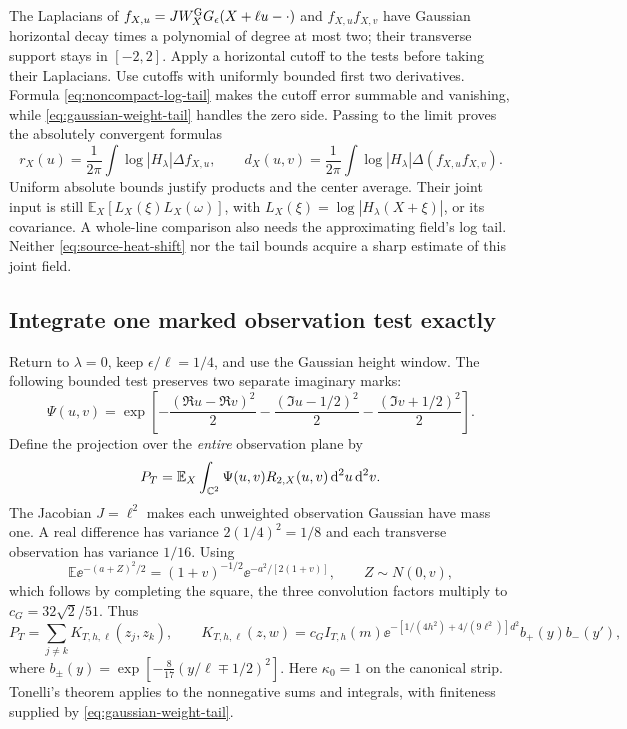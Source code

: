 The Laplacians of $f_{X,u}=JW_X^{\rm G}G_\epsilon(X+\ell u-\cdot)$
and $f_{X,u}f_{X,v}$ have Gaussian horizontal decay times a polynomial
of degree at most two; their transverse support stays in $[-2,2]$.
Apply a horizontal cutoff to the tests before taking their Laplacians.
Use cutoffs with uniformly bounded first two derivatives. Formula \eqref{eq:noncompact-log-tail} makes the
cutoff error summable and vanishing, while
\eqref{eq:gaussian-weight-tail} handles the zero side. Passing to the
limit proves the absolutely convergent formulas
\begin{equation}\label{eq:gaussian-log-contraction}
 r_X(u)=\frac1{2\pi}\int\log|H_\lambda|\Delta f_{X,u},\qquad
 d_X(u,v)=\frac1{2\pi}\int\log|H_\lambda|\Delta(f_{X,u}f_{X,v}).
\end{equation}
Uniform absolute bounds justify products and the center average.
Their joint input is still $\mathbb E_X[L_X(\xi)L_X(\omega)]$,
with $L_X(\xi)=\log|H_\lambda(X+\xi)|$, or its covariance.
A whole-line comparison also needs the approximating field's log tail.
Neither \eqref{eq:source-heat-shift} nor the tail bounds acquire a
sharp estimate of this joint field.

\subsection{Integrate one marked observation test exactly}

Return to $\lambda=0$, keep $\epsilon/\ell=1/4$, and use the Gaussian
height window. The following bounded test preserves two separate
imaginary marks:
\[
 \Psi(u,v)=\exp\left[-\frac{(\Re u-\Re v)^2}2
                     -\frac{(\Im u-1/2)^2}2
                     -\frac{(\Im v+1/2)^2}2\right].
\]
Define the projection over the \emph{entire} observation plane by
\begin{equation}\label{eq:marked-projection}
 P_T=\mathbb E_X\int_{\mathbb C^2}\Psi(u,v)R_{2,X}(u,v)\,\mathrm d^2u\,\mathrm d^2v.
\end{equation}
The Jacobian $J=\ell^2$ makes each unweighted observation Gaussian
have mass one. A real difference has variance $2(1/4)^2=1/8$ and
each transverse observation has variance $1/16$. Using
\[
 \mathbb E\ee^{-(a+Z)^2/2}
   =(1+v)^{-1/2}\ee^{-a^2/[2(1+v)]},\qquad Z\sim N(0,v),
\]
which follows by completing the square, the three convolution factors
multiply to $c_G=32\sqrt2/51$. Thus
\begin{equation}\label{eq:projection-kernel-general}
 P_T=\sum_{j\ne k}K_{T,h,\ell}(z_j,z_k),\qquad
 K_{T,h,\ell}(z,w)=c_G I_{T,h}(m)
   \ee^{-[1/(4h^2)+4/(9\ell^2)]d^2}b_+(y)b_-(y'),
\end{equation}
where $b_\pm(y)=\exp[-\frac8{17}(y/\ell\mp1/2)^2]$.
Here $\kappa_0=1$ on the canonical strip. Tonelli's theorem applies
to the nonnegative sums and integrals, with finiteness supplied by
\eqref{eq:gaussian-weight-tail}.

